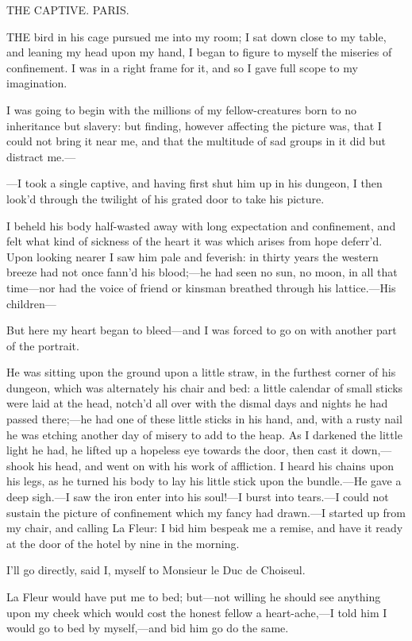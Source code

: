 \documentclass[twoside]{article}
\begin{document}
THE CAPTIVE.
PARIS.


THE bird in his cage pursued me into my room; I sat down close to my
table, and leaning my head upon my hand, I began to figure to myself the
miseries of confinement.  I was in a right frame for it, and so I gave
full scope to my imagination.

I was going to begin with the millions of my fellow-creatures born to no
inheritance but slavery: but finding, however affecting the picture was,
that I could not bring it near me, and that the multitude of sad groups
in it did but distract me.—

—I took a single captive, and having first shut him up in his dungeon, I
then look’d through the twilight of his grated door to take his picture.

I beheld his body half-wasted away with long expectation and confinement,
and felt what kind of sickness of the heart it was which arises from hope
deferr’d.  Upon looking nearer I saw him pale and feverish: in thirty
years the western breeze had not once fann’d his blood;—he had seen no
sun, no moon, in all that time—nor had the voice of friend or kinsman
breathed through his lattice.—His children—

But here my heart began to bleed—and I was forced to go on with another
part of the portrait.

He was sitting upon the ground upon a little straw, in the furthest
corner of his dungeon, which was alternately his chair and bed: a little
calendar of small sticks were laid at the head, notch’d all over with the
dismal days and nights he had passed there;—he had one of these little
sticks in his hand, and, with a rusty nail he was etching another day of
misery to add to the heap.  As I darkened the little light he had, he
lifted up a hopeless eye towards the door, then cast it down,—shook his
head, and went on with his work of affliction.  I heard his chains upon
his legs, as he turned his body to lay his little stick upon the
bundle.—He gave a deep sigh.—I saw the iron enter into his soul!—I burst
into tears.—I could not sustain the picture of confinement which my fancy
had drawn.—I started up from my chair, and calling La Fleur: I bid him
bespeak me a remise, and have it ready at the door of the hotel by nine
in the morning.

I’ll go directly, said I, myself to Monsieur le Duc de Choiseul.

La Fleur would have put me to bed; but—not willing he should see anything
upon my cheek which would cost the honest fellow a heart-ache,—I told him
I would go to bed by myself,—and bid him go do the same.
\end{document}
